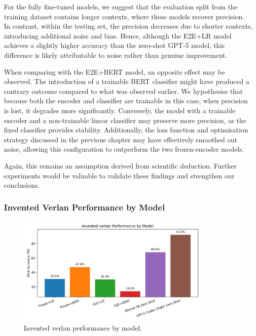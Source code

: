 \documentclass[12pt]{article}
\begin{document}
For the fully fine-tuned models, we suggest that the evaluation split from the training dataset contains longer contexts, where these models recover precision. 
In contrast, within the testing set, the precision decreases due to shorter contexts, introducing additional noise and bias. 
Hence, although the E2E+LR model achieves a slightly higher accuracy than the zero-shot GPT-5 model, this difference is likely attributable to noise rather than genuine improvement.

When comparing with the E2E+BERT model, an opposite effect may be observed. 
The introduction of a trainable BERT classifier might have produced a contrary outcome compared to what was observed earlier. 
We hypothesise that because both the encoder and classifier are trainable in this case, when precision is lost, it degrades more significantly. 
Conversely, the model with a trainable encoder and a non-trainable linear classifier may preserve more precision, as the fixed classifier provides stability. 
Additionally, the loss function and optimisation strategy discussed in the previous chapter may have effectively smoothed out noise, allowing this configuration to outperform the two frozen-encoder models.

Again, this remains an assumption derived from scientific deduction. 
Further experiments would be valuable to validate these findings and strengthen our conclusions.

\subsubsection{Invented Verlan Performance by Model}

\begin{figure}[htbp]
    \centering
    \includegraphics[width=0.85\textwidth]{figures/invented_verlan_comparison.png}
    \caption{Invented verlan performance by model.}
    \label{fig:invented-verlan-comparison}
\end{figure}
\end{document}
